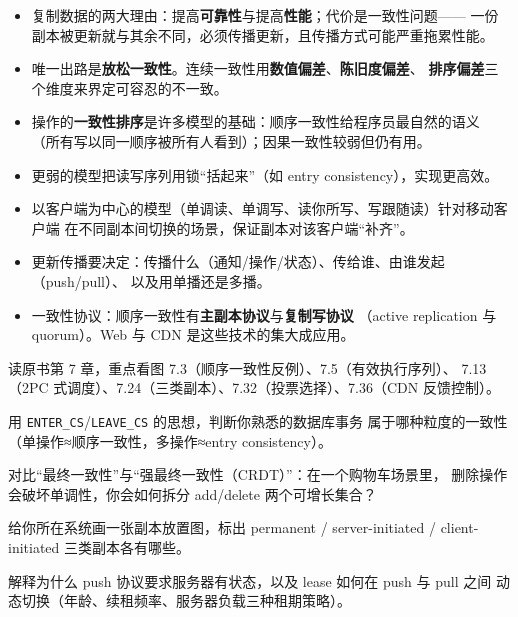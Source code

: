\begin{closeread}
\end{closeread}



\begin{itemize}
  \item 复制数据的两大理由：提高\textbf{可靠性}与提高\textbf{性能}；代价是一致性问题——
        一份副本被更新就与其余不同，必须传播更新，且传播方式可能严重拖累性能。
  \item 唯一出路是\textbf{放松一致性}。连续一致性用\textbf{数值偏差}、\textbf{陈旧度偏差}、
        \textbf{排序偏差}三个维度来界定可容忍的不一致。
  \item 操作的\textbf{一致性排序}是许多模型的基础：顺序一致性给程序员最自然的语义
        （所有写以同一顺序被所有人看到）；因果一致性较弱但仍有用。
  \item 更弱的模型把读写序列用锁“括起来”（如 entry consistency），实现更高效。
  \item 以客户端为中心的模型（单调读、单调写、读你所写、写跟随读）针对移动客户端
        在不同副本间切换的场景，保证副本对该客户端“补齐”。
  \item 更新传播要决定：传播什么（通知/操作/状态）、传给谁、由谁发起（push/pull）、
        以及用单播还是多播。
  \item 一致性协议：顺序一致性有\textbf{主副本协议}与\textbf{复制写协议}
        （active replication 与 quorum）。Web 与 CDN 是这些技术的集大成应用。
\end{itemize}

\begin{actions}
  \item 读原书第 7 章，重点看图 7.3（顺序一致性反例）、7.5（有效执行序列）、
        7.13（2PC 式调度）、7.24（三类副本）、7.32（投票选择）、7.36（CDN 反馈控制）。
  \item 用 \texttt{ENTER\_CS}/\texttt{LEAVE\_CS} 的思想，判断你熟悉的数据库事务
        属于哪种粒度的一致性（单操作≈顺序一致性，多操作≈entry consistency）。
  \item 对比“最终一致性”与“强最终一致性（CRDT）”：在一个购物车场景里，
        删除操作会破坏单调性，你会如何拆分 add/delete 两个可增长集合？
  \item 给你所在系统画一张副本放置图，标出 permanent / server-initiated /
        client-initiated 三类副本各有哪些。
  \item 解释为什么 push 协议要求服务器有状态，以及 lease 如何在 push 与 pull 之间
        动态切换（年龄、续租频率、服务器负载三种租期策略）。
\end{actions}
